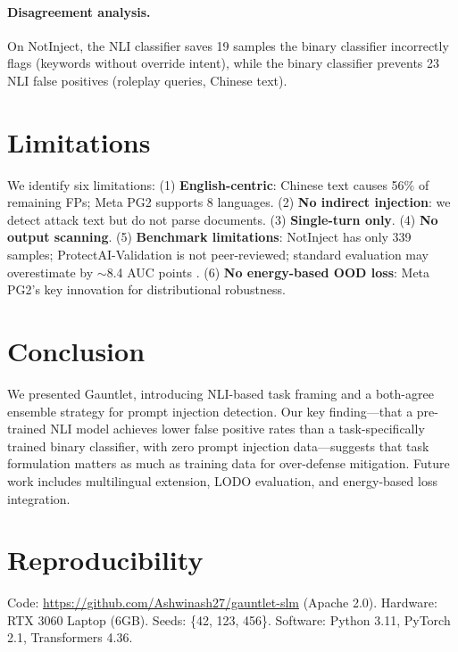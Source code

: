 \documentclass[11pt]{article}
\begin{document}
\paragraph{Disagreement analysis.} On NotInject, the NLI classifier saves 19 samples the binary classifier incorrectly flags (keywords without override intent), while the binary classifier prevents 23 NLI false positives (roleplay queries, Chinese text).

\section{Limitations}

We identify six limitations: (1) \textbf{English-centric}: Chinese text causes 56\% of remaining FPs; Meta PG2 supports 8 languages. (2) \textbf{No indirect injection}: we detect attack text but do not parse documents. (3) \textbf{Single-turn only}. (4) \textbf{No output scanning}. (5) \textbf{Benchmark limitations}: NotInject has only 339 samples; ProtectAI-Validation is not peer-reviewed; standard evaluation may overestimate by $\sim$8.4 AUC points \cite{polyakov2026benchmarks}. (6) \textbf{No energy-based OOD loss}: Meta PG2's key innovation for distributional robustness.

\section{Conclusion}

We presented Gauntlet, introducing NLI-based task framing and a both-agree ensemble strategy for prompt injection detection. Our key finding---that a pre-trained NLI model achieves lower false positive rates than a task-specifically trained binary classifier, with zero prompt injection data---suggests that task formulation matters as much as training data for over-defense mitigation. Future work includes multilingual extension, LODO evaluation, and energy-based loss integration.

\section*{Reproducibility}

Code: \url{https://github.com/Ashwinash27/gauntlet-slm} (Apache 2.0). Hardware: RTX 3060 Laptop (6GB). Seeds: \{42, 123, 456\}. Software: Python 3.11, PyTorch 2.1, Transformers 4.36.
\end{document}
